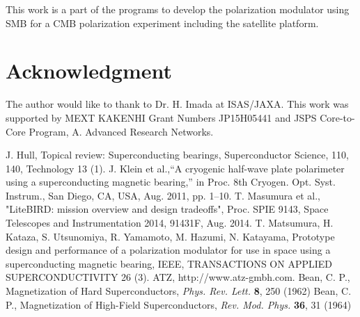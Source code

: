 \documentclass[journal]{IEEEtran}
\begin{document}
This work is a part of the programs to develop the polarization modulator using SMB for a CMB polarization experiment including the satellite platform.


\section*{Acknowledgment}
The author would like to thank to Dr. H. Imada at ISAS/JAXA. This work was supported by MEXT KAKENHI Grant Numbers JP15H05441 and JSPS Core-to-Core Program, A. Advanced Research Networks.

\ifCLASSOPTIONcaptionsoff
  \newpage
\fi





%
%
%
\begin{thebibliography}{99}

J. Hull, Topical review: Superconducting bearings, Superconductor Science, 110, 140, Technology 13 (1).
J. Klein et al.,“A cryogenic half-wave plate polarimeter using a superconducting magnetic bearing,” in Proc. 8th Cryogen. Opt. Syst. Instrum., San Diego, CA, USA, Aug. 2011, pp. 1–10.
T. Masumura et al., "LiteBIRD: mission overview and design tradeoffs", Proc. SPIE 9143, Space Telescopes and Instrumentation 2014, 91431F, Aug. 2014.
T. Matsumura, H. Kataza, S. Utsunomiya, R. Yamamoto, M. Hazumi, N. Katayama, Prototype design and performance of a polarization modulator for use in space using a superconducting magnetic bearing, IEEE, TRANSACTIONS ON APPLIED SUPERCONDUCTIVITY 26 (3).
ATZ, http://www.atz-gmbh.com.
Bean, C. P., Magnetization of Hard Superconductors, {\em Phys. Rev. Lett.\/} {\bf 8}, 250 (1962)
Bean, C. P., Magnetization of High-Field Superconductors, {\em Rev. Mod. Phys.\/} {\bf 36}, 31 (1964)
\end{thebibliography}
\end{document}
